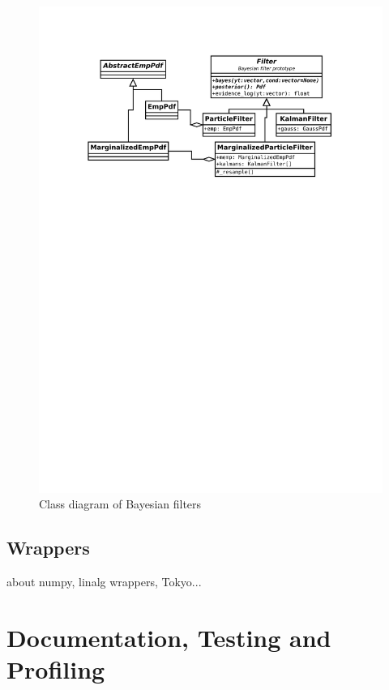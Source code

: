 \begin{figure}[h]
	\centering
	\includegraphics[width=\textwidth,keepaspectratio=true,clip=true,trim=3cm 192mm 3cm 3cm]{./diagrams/filters.pdf}
	\vspace{-8mm}
	\caption{Class diagram of Bayesian filters}
	\label{fig:DiaFilters}
\end{figure}

\subsection{Wrappers} \label{sec:PyBayesWrappers}

about numpy, linalg wrappers, Tokyo...

\section{Documentation, Testing and Profiling} \label{sec:PyBayesDocsTests}


